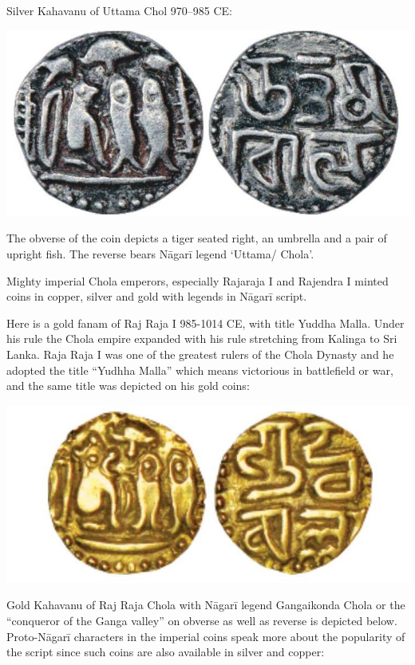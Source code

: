 Silver Kahavanu of Uttama Chol 970–985 CE:

\vskip 5pt

\centerline{\includegraphics[scale=1.1]{"images/article-06/art06-fig08.jpg"}}

The obverse of the coin depicts a tiger seated right, an umbrella and a pair of upright fish. The reverse bears Nāgarī legend ‘Uttama/ Chola’.

Mighty imperial Chola emperors, especially Rajaraja I and Rajendra I minted coins in copper, silver and gold with legends in Nāgarī script.

Here is a gold fanam of Raj Raja I 985-1014 CE, with title Yuddha Malla. Under his rule the Chola empire expanded with his rule stretching from Kalinga to Sri Lanka. Raja Raja I was one of the greatest rulers of the Chola Dynasty and he adopted the title “Yudhha Malla” which means victorious in battlefield or war, and the same title was depicted on his gold coins:

\vskip 4pt

\centerline{\includegraphics[scale=0.95]{"images/article-06/art06-fig09.jpg"}}

Gold Kahavanu of Raj Raja Chola with Nāgarī legend Gangaikonda Chola or the “conqueror of the Ganga valley” on obverse as well as reverse is depicted below. Proto-Nāgarī characters in the imperial coins speak more about the popularity of the script since such coins are also available in silver and copper:

